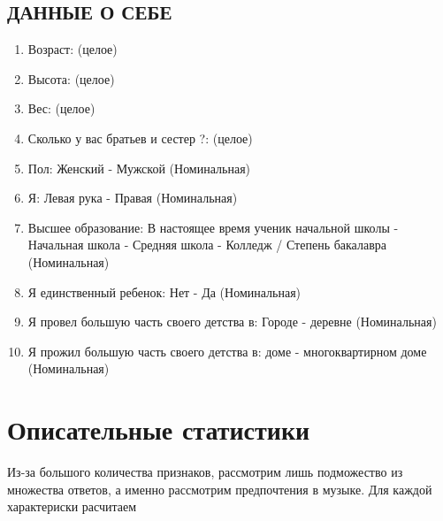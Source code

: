 \documentclass[11pt]{article}
\begin{document}
\subsection{ДАННЫЕ О СЕБЕ}
\begin{enumerate}
\item Возраст: (целое)
\item Высота: (целое)
\item Вес: (целое)
\item Сколько у вас братьев и сестер ?: (целое)
\item Пол: Женский - Мужской (Номинальная)
\item Я: Левая рука - Правая (Номинальная)
\item Высшее образование: В настоящее время ученик начальной школы - Начальная школа - Средняя школа - Колледж / Степень бакалавра (Номинальная)
\item Я единственный ребенок: Нет - Да (Номинальная)
\item Я провел большую часть своего детства в: Городе -  деревне (Номинальная)
\item Я прожил большую часть своего детства в: доме  - многоквартирном доме (Номинальная)
\end{enumerate}
\pagebreak

\section{Описательные статистики}
Из-за большого количества признаков, рассмотрим лишь подможество из множества ответов, а именно рассмотрим
предпочтения в музыке. Для каждой характериски расчитаем 
\end{document}
